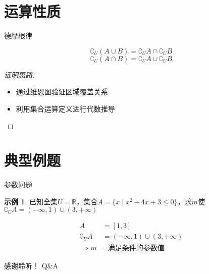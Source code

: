 \documentclass[10pt, aspectratio=169]{beamer}
\theoremstyle{definition}
\theoremstyle{example}
\newtheorem{example}{示例}[section]
\theoremstyle{remark}
\begin{document}
\section{运算性质}
\begin{frame}{德摩根律}
  \begin{theorem}[德摩根律]
    $$
    \complement_U (A \cup B) = \complement_U A \cap \complement_U B
    $$
    $$
    \complement_U (A \cap B) = \complement_U A \cup \complement_U B
    $$
  \end{theorem}
  
  \begin{proof}[证明思路]
    \begin{itemize}
      \item 通过维恩图验证区域覆盖关系
      \item 利用集合运算定义进行代数推导
    \end{itemize}
  \end{proof}
\end{frame}

\section{典型例题}
\begin{frame}{参数问题}
  \begin{example}
    已知全集$ U = \mathbb{R} $，集合$ A = \{x \mid x^2 - 4x + 3 \leq 0\} $，求$ m $使$ \complement_U A = (-\infty,1) \cup (3,+\infty) $
  \end{example}
  \vspace{0.5cm}
  \begin{solution}
    \begin{align*}
      A &= [1,3] \\
      \complement_U A &= (-\infty,1) \cup (3,+\infty) \\
      \Rightarrow m &= \text{满足条件的参数值}
    \end{align*}
  \end{solution}
\end{frame}

\begin{frame}[standout]
  \centering
  感谢聆听！
  \vfill
  Q\&A
\end{frame}
\end{document}
